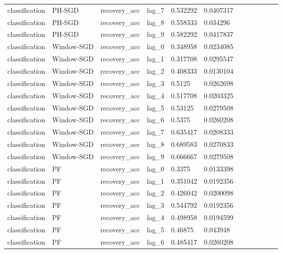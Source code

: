 \begin{tabular}{llllllllllll}
classification & PH-SGD & recovery\_acc & lag\_7 & 0.532292 & 0.0407317 &  &  &  &  &  &  \\
classification & PH-SGD & recovery\_acc & lag\_8 & 0.558333 & 0.034296 &  &  &  &  &  &  \\
classification & PH-SGD & recovery\_acc & lag\_9 & 0.582292 & 0.0417837 &  &  &  &  &  &  \\
classification & Window-SGD & recovery\_acc & lag\_0 & 0.348958 & 0.0234085 &  &  &  &  &  &  \\
classification & Window-SGD & recovery\_acc & lag\_1 & 0.317708 & 0.0295547 &  &  &  &  &  &  \\
classification & Window-SGD & recovery\_acc & lag\_2 & 0.408333 & 0.0130104 &  &  &  &  &  &  \\
classification & Window-SGD & recovery\_acc & lag\_3 & 0.5125 & 0.0262698 &  &  &  &  &  &  \\
classification & Window-SGD & recovery\_acc & lag\_4 & 0.517708 & 0.0203325 &  &  &  &  &  &  \\
classification & Window-SGD & recovery\_acc & lag\_5 & 0.53125 & 0.0279508 &  &  &  &  &  &  \\
classification & Window-SGD & recovery\_acc & lag\_6 & 0.5375 & 0.0260208 &  &  &  &  &  &  \\
classification & Window-SGD & recovery\_acc & lag\_7 & 0.635417 & 0.0208333 &  &  &  &  &  &  \\
classification & Window-SGD & recovery\_acc & lag\_8 & 0.689583 & 0.0270833 &  &  &  &  &  &  \\
classification & Window-SGD & recovery\_acc & lag\_9 & 0.666667 & 0.0279508 &  &  &  &  &  &  \\
classification & PF & recovery\_acc & lag\_0 & 0.3375 & 0.0133398 &  &  &  &  &  &  \\
classification & PF & recovery\_acc & lag\_1 & 0.351042 & 0.0192356 &  &  &  &  &  &  \\
classification & PF & recovery\_acc & lag\_2 & 0.426042 & 0.0200098 &  &  &  &  &  &  \\
classification & PF & recovery\_acc & lag\_3 & 0.544792 & 0.0192356 &  &  &  &  &  &  \\
classification & PF & recovery\_acc & lag\_4 & 0.498958 & 0.0194599 &  &  &  &  &  &  \\
classification & PF & recovery\_acc & lag\_5 & 0.46875 & 0.043948 &  &  &  &  &  &  \\
classification & PF & recovery\_acc & lag\_6 & 0.485417 & 0.0260208 &  &  &  &  &  &  \\

\end{tabular}
